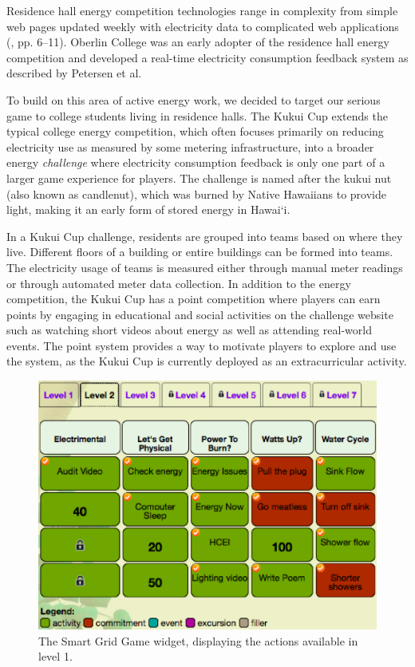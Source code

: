 \documentclass{sigchi}
\newcommand{\Hawaii}{Hawai`i\xspace}
\begin{document}
Residence hall energy competition technologies range in complexity from simple web pages updated weekly with electricity data to complicated web applications (\cite{csdl2-11-01}, pp. 6--11). Oberlin College was an early adopter of the residence hall energy competition and developed a real-time electricity consumption feedback system as described by Petersen et al.~\cite{petersen-dorm-energy-reduction}

To build on this area of active energy work, we decided to target our serious game to college students living in residence halls. The Kukui Cup extends the typical college energy competition, which often focuses primarily on reducing electricity use as measured by some metering infrastructure, into a broader energy \emph{challenge} where electricity consumption feedback is only one part of a larger game experience for players. The challenge is named after the kukui nut (also known as candlenut), which was burned by Native Hawaiians to provide light, making it an early form of stored energy in \Hawaii.

In a Kukui Cup challenge, residents are grouped into teams based on where they live. Different floors of a building or entire buildings can be formed into teams. The electricity usage of teams is measured either through manual meter readings or through automated meter data collection. In addition to the energy competition, the Kukui Cup has a point competition where players can earn points by engaging in educational and social activities on the challenge website such as watching short videos about energy as well as attending real-world events. The point system provides a way to motivate players to explore and use the system, as the Kukui Cup is currently deployed as an extracurricular activity.

\begin{figure}[!tb]
	\centering
	\includegraphics[width=0.95\columnwidth]{smart-grid2.eps}
	\caption{The Smart Grid Game widget, displaying the actions available in level 1.}
	\label{fig:smart-grid}
\end{figure}
\end{document}
